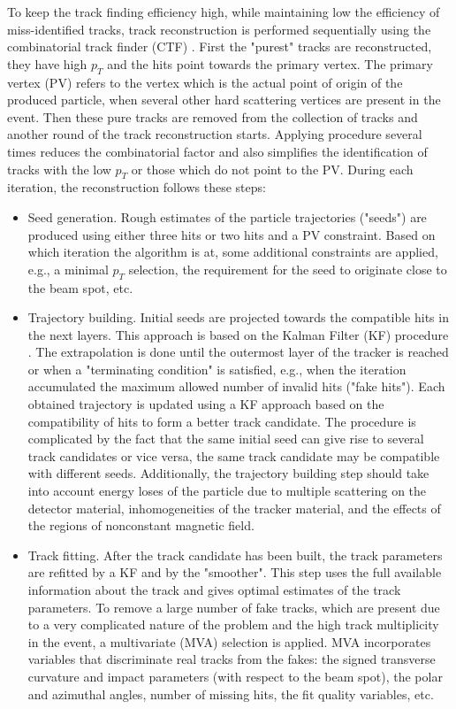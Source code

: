 To keep the track finding efficiency high, while maintaining low the efficiency of miss-identified tracks, track reconstruction is performed sequentially using the combinatorial track finder (CTF) \cite{combined_track_finding}. First the "purest" tracks are reconstructed, they have high $p_T$ and the hits point towards the primary vertex. The primary vertex (PV) refers to the vertex which is the actual point of origin of the produced particle, when several other hard scattering vertices are present in the event. Then these pure tracks are removed from the collection of tracks and another round of the track reconstruction starts. Applying procedure several times reduces the combinatorial factor and also simplifies the identification of tracks with the low $p_T$ or those which do not point to the PV. During each iteration, the reconstruction follows these steps:

\begin{itemize}
\item Seed generation. Rough estimates of the particle trajectories ("seeds") are produced using either three hits or two hits and a PV constraint. Based on which iteration the algorithm is at, some additional constraints are applied, e.g., a minimal $p_T$ selection, the requirement for the seed to originate close to the beam spot, etc. 
\item Trajectory building. Initial seeds are projected towards the compatible hits in the next layers. This approach is based on the Kalman Filter (KF) procedure \cite{Kalman_filter}. The extrapolation is done until the outermost layer of the tracker is reached or when a "terminating condition" is satisfied, e.g., when the iteration accumulated the maximum allowed number of invalid hits ("fake hits"). Each obtained trajectory is updated using a KF approach based on the compatibility of hits to form a better track candidate. The procedure is complicated by the fact that the same initial seed can give rise to several track candidates or vice versa, the same track candidate may be compatible with different seeds. Additionally, the trajectory building step should take into account energy loses of the particle due to multiple scattering on the detector material, inhomogeneities of the tracker material, and the effects of the regions of nonconstant magnetic field. 
\item Track fitting. After the track candidate has been built, the track parameters are refitted by a KF and by the "smoother". This step uses the full available information about the track and gives optimal estimates of the track parameters. To remove a large number of fake tracks, which are present due to a very complicated nature of the problem and the high track multiplicity in the event, a multivariate (MVA) selection is applied. MVA incorporates variables that discriminate real tracks from the fakes: the signed transverse curvature and impact parameters (with respect to the beam spot), the polar and azimuthal angles, number of missing hits, the fit quality variables, etc. 
\end{itemize}

